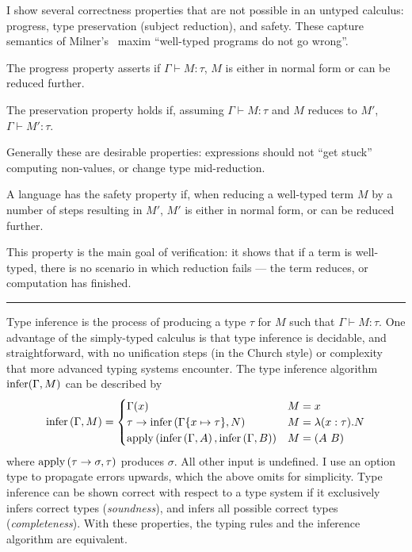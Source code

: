 I show several correctness properties that are not possible in an untyped calculus: progress, type preservation (subject reduction), and safety.
These capture semantics of Milner's~\cite{milner} maxim ``well-typed programs do not go wrong''.

\begin{definition}
The progress property asserts if \(\Gamma \vdash M : \tau\), \(M\) is either in normal form or can be reduced further.
\end{definition}

\begin{definition}
The preservation property holds if, assuming \(\Gamma \vdash M : \tau\) and \(M\) reduces to \(M'\), \(\Gamma \vdash M' : \tau\).
\end{definition}

Generally these are desirable properties: expressions should not ``get stuck'' computing non-values, or change type mid-reduction.

\begin{definition}
A language has the safety property if, when reducing a well-typed term \(M\) by a number of steps resulting in \(M'\), \(M'\) is either in normal form, or can be reduced further.
\end{definition}

This property is the main goal of verification: it shows that if a term is well-typed, there is no scenario in which reduction fails --- the term reduces, or computation has finished.

\begin{center}
\rule{.3\textwidth}{.5pt}
\end{center}

Type inference is the process of producing a type \(\tau\) for \(M\) such that \(\Gamma \vdash M : \tau\).
One advantage of the simply-typed calculus is that type inference is decidable, and straightforward, with no unification steps (in the Church style) or complexity that more advanced typing systems encounter.
The type inference algorithm \(\mathrm{infer}(\Gamma, M)\) can be described by
\[
\mathrm{infer}\left(\Gamma, M\right) =
\begin{cases}
\Gamma(x) & M = x\\
\tau \to \mathrm{infer}\left(\Gamma\{x \mapsto \tau\}, N\right) & M = \lambda (x : \tau). N\\
\mathrm{apply}\left(\mathrm{infer}\left(\Gamma, A\right), \mathrm{infer}\left(\Gamma, B\right)\right) & M = \left(A\ B\right)
\end{cases}
\]
where \(\mathrm{apply}\left(\tau \to \sigma, \tau\right)\) produces \(\sigma\).
All other input is undefined.
I use an option type to propagate errors upwards, which the above omits for simplicity.
Type inference can be shown correct with respect to a type system if it exclusively infers correct types (\emph{soundness}), and infers all possible correct types (\emph{completeness}).
With these properties, the typing rules and the inference algorithm are equivalent.

